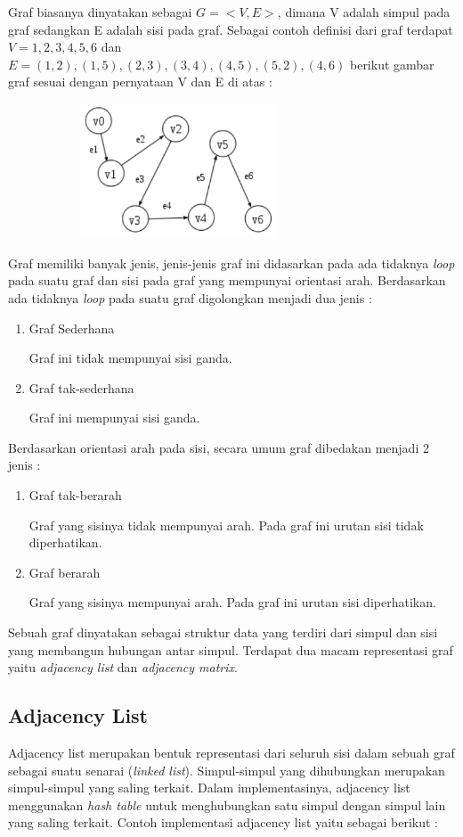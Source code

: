 \documentclass[a4paper,twoside]{article}
\begin{document}
\begin{enumerate}
Graf biasanya dinyatakan sebagai $G = <V,E>$, dimana V adalah simpul pada graf sedangkan E adalah sisi pada graf. Sebagai contoh definisi dari graf terdapat $V = {1,2,3,4,5,6}$ dan $E = {(1,2),(1,5),(2,3),(3,4),(4,5),(5,2),(4,6)}$ berikut gambar graf sesuai dengan pernyataan V dan E di atas :

	\begin{figure} [H]
		\centering  
		\includegraphics[width=8cm, height=4cm]{graf1} 
		\label{fig:graf1} 
	\end{figure}
	
Graf memiliki banyak jenis, jenis-jenis graf ini didasarkan pada ada tidaknya \textit{loop} pada suatu graf dan sisi pada graf yang mempunyai orientasi arah. Berdasarkan ada tidaknya \textit{loop} pada suatu graf digolongkan menjadi dua jenis :
\begin{enumerate}
	\item Graf Sederhana
	
	Graf ini tidak mempunyai sisi ganda.
	\item Graf tak-sederhana
	
	Graf ini mempunyai sisi ganda.
\end{enumerate}

Berdasarkan orientasi arah pada sisi, secara umum graf dibedakan menjadi 2 jenis :
\begin{enumerate}
	\item Graf tak-berarah
	
	Graf yang sisinya tidak mempunyai arah. Pada graf ini urutan sisi tidak diperhatikan.
	\item Graf berarah
	
	Graf yang sisinya mempunyai arah. Pada graf ini urutan sisi diperhatikan. 
\end{enumerate}

Sebuah graf dinyatakan sebagai struktur data yang terdiri dari simpul dan sisi yang membangun hubungan antar simpul. Terdapat dua macam representasi graf yaitu \textit{adjacency list} dan \textit{adjacency matrix}. 
\subsection{Adjacency List}
Adjacency list merupakan bentuk representasi dari seluruh sisi dalam sebuah graf sebagai suatu senarai (\textit{linked list}). Simpul-simpul yang dihubungkan merupakan simpul-simpul yang saling terkait. Dalam implementasinya, adjacency list menggunakan \textit{hash table} untuk menghubungkan satu simpul dengan simpul lain yang saling terkait. Contoh implementasi adjacency list yaitu sebagai berikut :


\end{enumerate}
\end{document}

